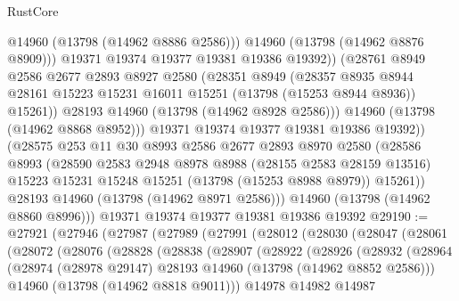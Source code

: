 \begin{lexlean}{RustCore}
\begin{coremodule}
                    @14960
                    (@13798 (@14962 @8886 @2586)))
                  @14960
                  (@13798 (@14962 @8876 @8909)))
                @19371
                @19374
                @19377
                @19381
                @19386
                @19392))
            (@28761
              @8949
              @2586
              @2677
              @2893
              @8927
              @2580
              (@28351
                @8949
                (@28357
                  @8935
                  @8944
                  @28161
                  @15223
                  @15231
                  @16011
                  @15251
                  (@13798 (@15253 @8944 @8936))
                  @15261))
              @28193
              @14960
              (@13798 (@14962 @8928 @2586)))
            @14960
            (@13798 (@14962 @8868 @8952)))
          @19371
          @19374
          @19377
          @19381
          @19386
          @19392))
      (@28575
        @253
        @11
        @30
        @8993
        @2586
        @2677
        @2893
        @8970
        @2580
        (@28586
          @8993
          (@28590
            @2583
            @2948
            @8978
            @8988
            (@28155 @2583 @28159 @13516)
            @15223
            @15231
            @15248
            @15251
            (@13798 (@15253 @8988 @8979))
            @15261))
        @28193
        @14960
        (@13798 (@14962 @8971 @2586)))
      @14960
      (@13798 (@14962 @8860 @8996)))
    @19371
    @19374
    @19377
    @19381
    @19386
    @19392
@29190 := @27921
    (@27946
      (@27987
        (@27989
          (@27991
            (@28012
              (@28030
                (@28047
                  (@28061
                    (@28072
                      (@28076
                        (@28828
                          (@28838
                            (@28907
                              (@28922
                                (@28926
                                  (@28932
                                    (@28964
                                      (@28974
                                        (@28978 @29147)
                                        @28193
                                        @14960
                                        (@13798 (@14962 @8852 @2586)))
                                      @14960
                                      (@13798 (@14962 @8818 @9011)))
                                    @14978
                                    @14982
                                    @14987

\end{coremodule}
\end{lexlean}
